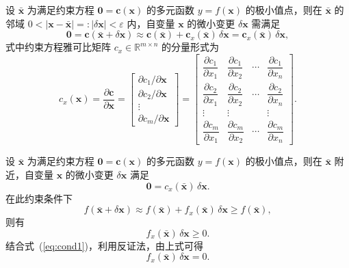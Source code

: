 设 $\bar{\boldsymbol{x}}$ 为满足约束方程 $\boldsymbol{0} = \boldsymbol{c}(\boldsymbol{x})$ 的多元函数 $y = f(\boldsymbol{x})$ 的极小值点，则在 $\bar{\boldsymbol{x}}$ 的邻域 $0 < |\boldsymbol{x} - \bar{\boldsymbol{x}}| =: |\delta\boldsymbol{x}| < \varepsilon$ 内，自变量 $\boldsymbol{x}$ 的微小变更 $\delta\boldsymbol{x}$ 需满足
\begin{equation*}
\boldsymbol{0} = \boldsymbol{c}(\bar{\boldsymbol{x}} + \delta\boldsymbol{x}) \approx \boldsymbol{c}(\bar{\boldsymbol{x}}) + \boldsymbol{c}_x(\bar{\boldsymbol{x}})\,\delta\boldsymbol{x} = \boldsymbol{c}_x(\bar{\boldsymbol{x}})\,\delta\boldsymbol{x},
\end{equation*}
式中约束方程雅可比矩阵 $c_x \in \mathbb{R}^{m \times n}$ 的分量形式为
\begin{equation*}
c_x(\boldsymbol{x}) = \frac{\partial \boldsymbol{c}}{\partial \boldsymbol{x}} = \begin{bmatrix} \partial c_1 / \partial \boldsymbol{x} \\ \partial c_2 / \partial \boldsymbol{x} \\ \vdots \\ \partial c_m / \partial \boldsymbol{x} \end{bmatrix} = \begin{bmatrix} \dfrac{\partial c_1}{\partial x_1} & \dfrac{\partial c_1}{\partial x_2} & \cdots & \dfrac{\partial c_1}{\partial x_n} \\ \dfrac{\partial c_2}{\partial x_1} & \dfrac{\partial c_2}{\partial x_2} & \cdots & \dfrac{\partial c_2}{\partial x_n} \\ \vdots & \vdots & & \vdots \\ \dfrac{\partial c_m}{\partial x_1} & \dfrac{\partial c_m}{\partial x_2} & \cdots & \dfrac{\partial c_m}{\partial x_n} \end{bmatrix}.
\end{equation*}

设 $\bar{\boldsymbol{x}}$ 为满足约束方程 $\boldsymbol{0} = \boldsymbol{c}(\boldsymbol{x})$ 的多元函数 $y = f(\boldsymbol{x})$ 的极小值点，则在 $\bar{\boldsymbol{x}}$ 附近，自变量 $\boldsymbol{x}$ 的微小变更 $\delta\boldsymbol{x}$ 满足
\begin{equation}\tag{I}\label{eq:cond1}
\boldsymbol{0} = c_x(\bar{\boldsymbol{x}})\,\delta\boldsymbol{x}.
\end{equation}
在此约束条件下
\begin{equation*}
f(\bar{\boldsymbol{x}} + \delta\boldsymbol{x}) \approx f(\bar{\boldsymbol{x}}) + f_x(\bar{\boldsymbol{x}})\,\delta\boldsymbol{x} \geq f(\bar{\boldsymbol{x}}),
\end{equation*}
则有
\begin{equation*}
f_x(\bar{\boldsymbol{x}})\,\delta\boldsymbol{x} \geq 0.
\end{equation*}
结合式~(\ref{eq:cond1})，利用反证法，由上式可得
\begin{equation}\tag{II}\label{eq:cond2}
f_x(\bar{\boldsymbol{x}})\,\delta\boldsymbol{x} = 0.
\end{equation}


